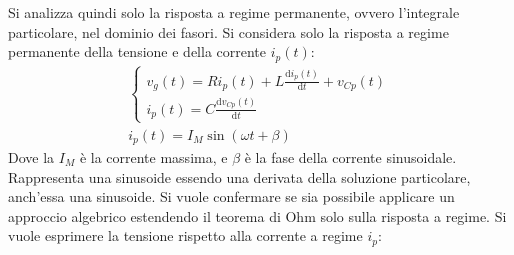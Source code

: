 \documentclass{article}
\newcommand{\df}{\mathrm{d}}
\numberwithin{equation}{subsection}
\begin{document}
%        
%
Si analizza quindi solo la risposta a regime permanente, ovvero l'integrale particolare, nel dominio dei fasori. Si considera solo la risposta a regime permanente della 
tensione e della corrente $i_p(t)$:
\begin{gather*}
    \begin{cases}
        v_g(t)=Ri_p(t)+\displaystyle L\frac{\df i_p(t)}{\df t}+v_{Cp}(t)\\
        i_p(t)=\displaystyle C\frac{\df v_{Cp}(t)}{\df t}
    \end{cases}\\
    i_p(t)=I_M\sin(\omega t+\beta)
\end{gather*}
Dove la $I_M$ è la corrente massima, e $\beta$ è la fase della corrente sinusoidale. Rappresenta una sinusoide essendo una derivata della soluzione particolare, anch'essa 
una sinusoide. Si vuole confermare se sia possibile applicare un approccio algebrico estendendo il 
teorema di Ohm solo sulla risposta a regime. Si vuole esprimere la tensione rispetto alla corrente a regime $i_p$:
\end{document}
